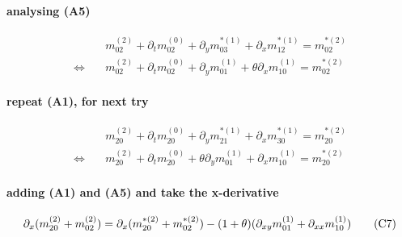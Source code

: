 \documentclass{article}
\begin{document}
  \paragraph{analysing (A5)}
  \begin{align*}
    &
    m_{02}^{(2)} + \partial_t m_{02}^{(0)} + \partial_y m_{03}^{*(1)} + \partial_x m_{12}^{*(1)} = m_{02}^{*(2)}
    \\ \Leftrightarrow\quad &
    m_{02}^{(2)} + \partial_t m_{02}^{(0)} + \partial_y m_{01}^{(1)} + \theta\partial_x m_{10}^{(1)} = m_{02}^{*(2)}
  \end{align*}

  \paragraph{repeat (A1), for next try}
  \begin{align*}
    &
    m_{20}^{(2)} + \partial_t m_{20}^{(0)} + \partial_y m_{21}^{*(1)} + \partial_x m_{30}^{*(1)} = m_{20}^{*(2)}
    \\ \Leftrightarrow\quad &
    m_{20}^{(2)} + \partial_t m_{20}^{(0)} + \theta\partial_y m_{01}^{(1)} + \partial_x m_{10}^{(1)} = m_{20}^{*(2)}
  \end{align*}

  \paragraph{adding (A1) and (A5) and take the x-derivative}
  \begin{equation}
    \partial_x (m_{20}^{(2)} + m_{02}^{(2)}) =\partial_x (m_{20}^{*(2)} + m_{02}^{*(2)}) - (1+\theta)(\partial_{xy} m_{01}^{(1)} + \partial_{xx} m_{10}^{(1)})  \tag{C7} \\
  \end{equation}

  \pagebreak
\end{document}
